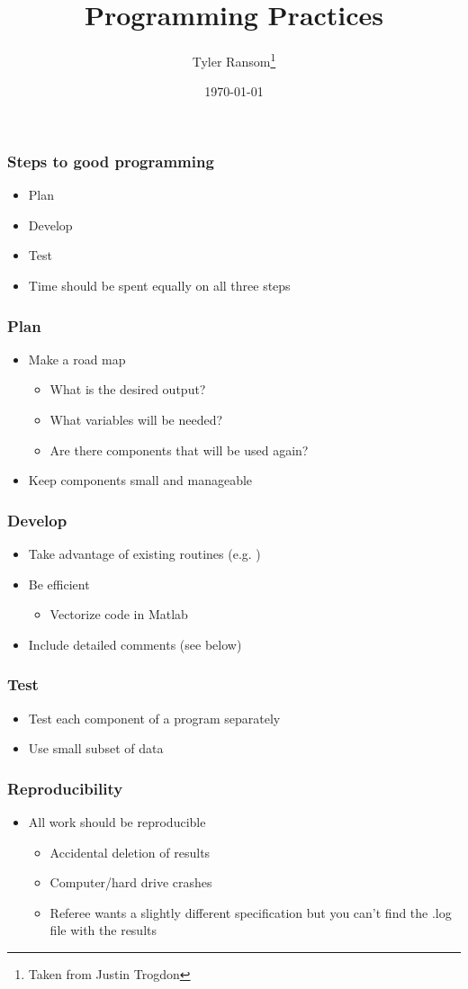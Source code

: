 \documentclass[english,xcolor=dvipsnames]{beamer}
\title[]{Programming Practices}
\author{Tyler Ransom\thanks{Taken from Justin Trogdon}}
\date{\today}
\newcommand{\bi}{\begin{itemize}}
\newcommand{\ei}{\end{itemize}}
\begin{document}
\begin{frame}
   \titlepage
\end{frame}


\begin{frame}
\frametitle{Steps to good programming}

   \bi 
   \item Plan
   \item Develop
   \item Test
   \item Time should be spent equally on all three steps
   \ei
\end{frame}

\begin{frame}
\frametitle{Plan}

   \bi 
   \item Make a road map
      \bi 
      \item What is the desired output?
      \item What variables will be needed?
      \item Are there components that will be used again?
      \ei
   \item Keep components small and manageable
   \ei
\end{frame}

\begin{frame}
\frametitle{Develop}

   \bi 
   \item Take advantage of existing routines (e.g. )
   \item Be efficient
      \bi 
      \item Vectorize code in Matlab
      \ei
   \item Include detailed comments (see below)
   \ei
\end{frame}

\begin{frame}
\frametitle{Test}

   \bi 
   \item Test each component of a program separately
   \item Use small subset of data
   \ei
\end{frame}

\begin{frame}
\frametitle{Reproducibility}

   \bi 
   \item All work should be reproducible
      \bi 
      \item Accidental deletion of results
      \item Computer/hard drive crashes
      \item Referee wants a slightly different specification but you can't find the .log file with the results
      \ei
   \ei
\end{frame}
\end{document}
